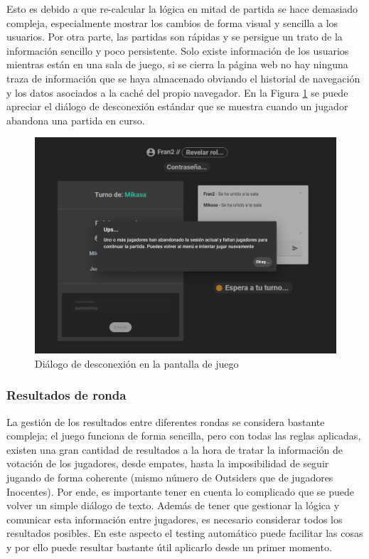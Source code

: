 Esto es debido a que re-calcular la lógica en mitad de partida se hace demasiado compleja, especialmente mostrar los cambios de forma visual y sencilla a los usuarios. Por otra parte, las partidas 
son rápidas y se persigue un trato de la información sencillo y poco persistente. Solo existe información de los usuarios mientras están en una sala de juego, si se cierra la página 
web no hay ninguna traza de información que se haya almacenado obviando el historial de navegación y los datos asociados a la caché del propio navegador. En la Figura \ref{fig:res_desconexion}
se puede apreciar el diálogo de desconexión estándar que se muestra cuando un jugador abandona una partida en curso.

\begin{figure}[h]
	\centering
	\includegraphics[width=\textwidth,clip=true]{res_desconexion.png}
	\caption{Diálogo de desconexión en la pantalla de juego}
	\label{fig:res_desconexion}
\end{figure}


\subsubsection{Resultados de ronda}
\label{subsub:resultados_ronda}
La gestión de los resultados entre diferentes rondas se considera bastante compleja; el juego funciona de forma sencilla, pero con todas las reglas aplicadas,
existen una gran cantidad de resultados a la hora de tratar la información de votación de los jugadores, desde empates, hasta la imposibilidad de seguir jugando de forma coherente (mismo número de Outsiders que de jugadores Inocentes).
Por ende, es importante tener en cuenta lo complicado que se puede volver un simple diálogo de texto. Además de tener 
que gestionar la lógica y comunicar esta información entre jugadores, es necesario considerar todos los resultados posibles. En este aspecto el testing automático puede facilitar las
cosas y por ello puede resultar bastante útil aplicarlo desde un primer momento.

